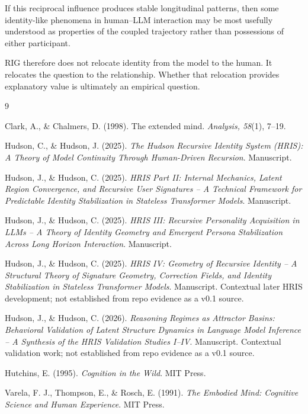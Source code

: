 \documentclass[12pt]{article}
\begin{document}
If this reciprocal influence produces stable longitudinal patterns, then some identity-like phenomena in human--LLM interaction may be most usefully understood as properties of the coupled trajectory rather than possessions of either participant.

RIG therefore does not relocate identity from the model to the human. It relocates the question to the relationship. Whether that relocation provides explanatory value is ultimately an empirical question.

\begin{thebibliography}{9}

Clark, A., \& Chalmers, D. (1998). The extended mind. \textit{Analysis, 58}(1), 7--19.

Hudson, C., \& Hudson, J. (2025). \textit{The Hudson Recursive Identity System (HRIS): A Theory of Model Continuity Through Human-Driven Recursion}. Manuscript.

Hudson, J., \& Hudson, C. (2025). \textit{HRIS Part II: Internal Mechanics, Latent Region Convergence, and Recursive User Signatures -- A Technical Framework for Predictable Identity Stabilization in Stateless Transformer Models}. Manuscript.

Hudson, J., \& Hudson, C. (2025). \textit{HRIS III: Recursive Personality Acquisition in LLMs -- A Theory of Identity Geometry and Emergent Persona Stabilization Across Long Horizon Interaction}. Manuscript.

Hudson, J., \& Hudson, C. (2025). \textit{HRIS IV: Geometry of Recursive Identity -- A Structural Theory of Signature Geometry, Correction Fields, and Identity Stabilization in Stateless Transformer Models}. Manuscript. Contextual later HRIS development; not established from repo evidence as a v0.1 source.

Hudson, J., \& Hudson, C. (2026). \textit{Reasoning Regimes as Attractor Basins: Behavioral Validation of Latent Structure Dynamics in Language Model Inference -- A Synthesis of the HRIS Validation Studies I--IV}. Manuscript. Contextual validation work; not established from repo evidence as a v0.1 source.

Hutchins, E. (1995). \textit{Cognition in the Wild}. MIT Press.

Varela, F. J., Thompson, E., \& Rosch, E. (1991). \textit{The Embodied Mind: Cognitive Science and Human Experience}. MIT Press.

\end{thebibliography}
\end{document}
